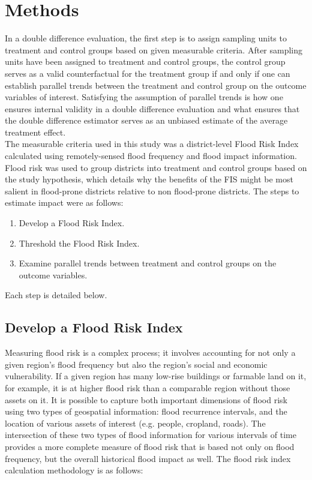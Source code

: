 \chapter{Methods}


In a double difference evaluation, the first step is to assign sampling units to treatment and control groups based on given measurable criteria. After sampling units have been assigned to treatment and control groups, the control group serves as a valid counterfactual for the treatment group if and only if one can establish parallel trends between the treatment and control group on the outcome variables of interest. Satisfying the assumption of parallel trends is how one ensures internal validity in a double difference evaluation and what ensures that the  double difference estimator serves as an unbiased estimate of the average treatment effect.\\

The measurable criteria used in this study was a district-level Flood Risk Index calculated using remotely-sensed flood frequency and flood impact information. Flood risk was used to group districts into treatment and control groups based on the study hypothesis, which details why the benefits of the FIS might be most salient in flood-prone districts relative to non flood-prone districts. The steps to estimate impact were as follows:

\begin{enumerate}
  \item Develop a Flood Risk Index.
  \item Threshold the Flood Risk Index.
  \item Examine parallel trends between treatment and control groups on the outcome variables.
\end{enumerate}

Each step is detailed below.

\section{Develop a Flood Risk Index}

Measuring flood risk is a complex process; it involves accounting for not only a given region’s flood frequency but also the region’s social and economic vulnerability. If a given region has many low-rise buildings or farmable land on it, for example, it is at higher flood risk than a comparable region without those assets on it. It is possible to capture both important dimensions of flood risk using two types of geospatial information: flood recurrence intervals, and the location of various assets of interest (e.g. people, cropland, roads). The intersection of these two types of flood information for various intervals of time provides a more complete measure of flood risk that is based not only on flood frequency, but the overall historical flood impact as well. The flood risk index calculation methodology is as follows:

